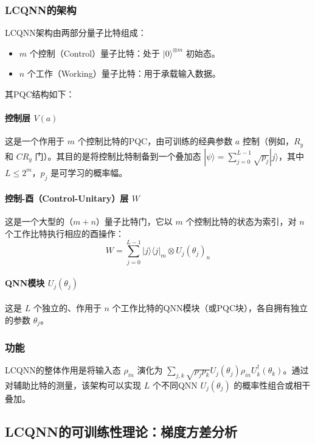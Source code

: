 \documentclass[12pt,a4paper]{article}
\begin{document}
\subsubsection{LCQNN的架构}

LCQNN架构由两部分量子比特组成：
\begin{itemize}
\item $m$ 个控制（Control）量子比特：处于 $|0\rangle^{\otimes m}$ 初始态。
\item $n$ 个工作（Working）量子比特：用于承载输入数据。
\end{itemize}

其PQC结构如下：

\paragraph{控制层 $V(a)$}
这是一个作用于 $m$ 个控制比特的PQC，由可训练的经典参数 $a$ 控制（例如，$R_y$ 和 $CR_y$ 门）。其目的是将控制比特制备到一个叠加态 $|\psi\rangle = \sum_{j=0}^{L-1} \sqrt{p_j} |j\rangle$，其中 $L \le 2^m$，$p_j$ 是可学习的概率幅。

\paragraph{控制-酉（Control-Unitary）层 $W$}
这是一个大型的（$m+n$）量子比特门，它以 $m$ 个控制比特的状态为索引，对 $n$ 个工作比特执行相应的酉操作：
\begin{equation}
W = \sum_{j=0}^{L-1} |j\rangle\langle j|_m \otimes U_j(\theta_j)_n
\end{equation}

\paragraph{QNN模块 $U_j(\theta_j)$}
这是 $L$ 个独立的、作用于 $n$ 个工作比特的QNN模块（或PQC块），各自拥有独立的参数 $\theta_j$。

\subsubsection{功能}

LCQNN的整体作用是将输入态 $\rho_{in}$ 演化为 $\sum_{j,k} \sqrt{p_j p_k} U_j(\theta_j) \rho_{in} U_k^\dagger(\theta_k)$。通过对辅助比特的测量，该架构可以实现 $L$ 个不同QNN $U_j(\theta_j)$ 的概率性组合或相干叠加。

\subsection{LCQNN的可训练性理论：梯度方差分析}
\end{document}
